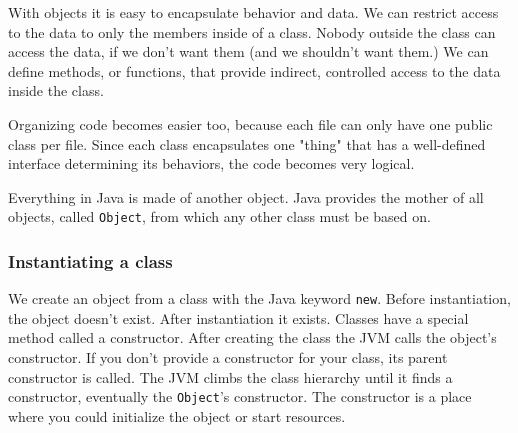 With objects it is easy to encapsulate behavior and data. We can restrict access to the data to only the members inside of a class. Nobody outside the class can access the data, if we don't want them (and we shouldn't want them.) We can define methods, or functions, 	that provide indirect, controlled access to the data inside the class.

Organizing code becomes easier too, because each file can only have one  public class per file\cite{spec}. Since each class encapsulates one "thing" that has a well-defined interface determining its behaviors, the code becomes very logical.

Everything in Java is made of another object. Java provides the mother of all objects, called \texttt{Object}, from which any other class must be based on.

\subsubsection{Instantiating a class}
We create an object from a class with the Java keyword \texttt{new}. Before instantiation, the object doesn't exist. After instantiation it exists. Classes have a special method called a constructor. After creating the class the JVM calls the object's constructor. If you don't provide a constructor for your class, its parent constructor is called. The JVM climbs the class hierarchy until it finds  a constructor, eventually the \texttt{Object}'s constructor. The constructor is a place where you could initialize the object or start resources.\cite{nicholas}
